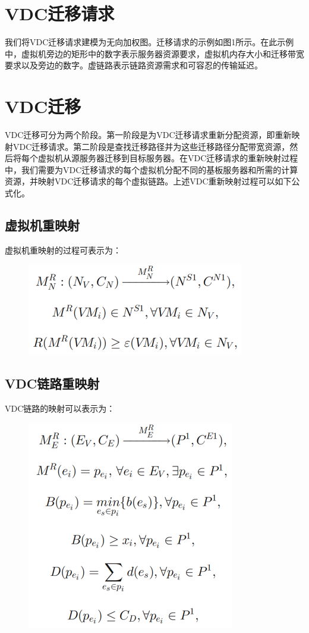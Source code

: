 \section{VDC迁移请求}
我们将VDC迁移请求建模为无向加权图。迁移请求的示例如图1所示。在此示例中，虚拟机旁边的矩形中的数字表示服务器资源要求，虚拟机内存大小和迁移带宽要求以及旁边的数字。虚链路表示链路资源需求和可容忍的传输延迟。

\section{VDC迁移}
VDC迁移可分为两个阶段。第一阶段是为VDC迁移请求重新分配资源，即重新映射VDC迁移请求。第二阶段是查找迁移路径并为这些迁移路径分配带宽资源，然后将每个虚拟机从源服务器迁移到目标服务器。在VDC迁移请求的重新映射过程中，我们需要为VDC迁移请求的每个虚拟机分配不同的基板服务器和所需的计算资源，并映射VDC迁移请求的每个虚拟链路。上述VDC重新映射过程可以如下公式化。

\subsection{虚拟机重映射}
虚拟机重映射的过程可表示为：

\begin{figure}[!htb]
  \centering
  \includegraphics{./Figure/express1.png}
\end{figure}

\subsection{VDC链路重映射}
VDC链路的映射可以表示为：

\begin{figure}[!htb]
  \centering
  \includegraphics{./Figure/express2.png}
\end{figure}

